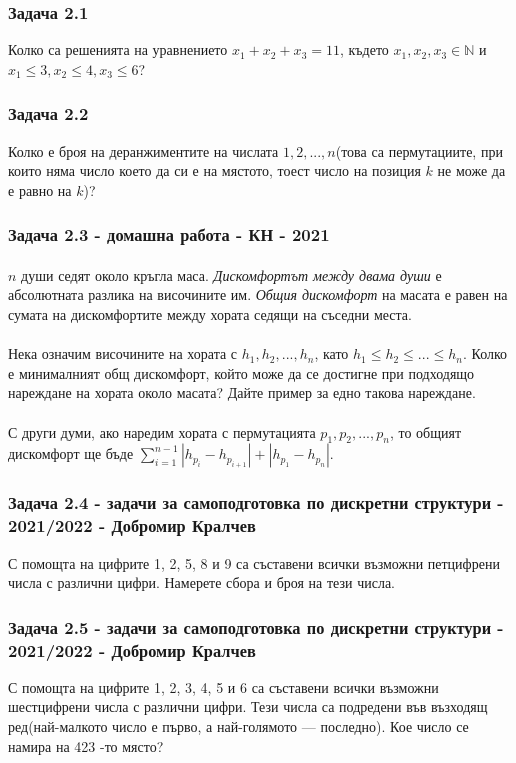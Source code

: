 \documentclass[12pt]{article}
\begin{document}
\subsubsection*{Задача 2.1}
Колко са решенията на уравнението $x_1 + x_2 + x_3 = 11$, където $x_1, x_2, x_3 \in \mathbb{N}$ и $x_1 \leq 3, x_2 \leq 4, x_3 \leq 6$?
\subsubsection*{Задача 2.2}
Колко е броя на деранжиментите на числата $1, 2, ..., n$(това са пермутациите, при които няма число което да си е на мястото, тоест число на позиция $k$ не може да е равно на $k$)?
\subsubsection*{Задача 2.3 - домашна работа - КН - 2021}
\paragraph*{}
$n$ души седят около кръгла маса. \emph{Дискомфортът между двама души} е абсолютната разлика на височините им. \emph{Общия дискомфорт} на масата е равен на
сумата на дискомфортите между хората седящи на съседни места.
\paragraph*{}
Нека означим височините на хората с $h_1, h_2, ..., h_n$, като $h_1 \leq h_2 \leq ... \leq h_n$. Колко е минималният общ дискомфорт, който може да се достигне при подходящо нареждане на хората около масата? Дайте пример за едно такова нареждане.
\paragraph*{}
С други думи, ако наредим хората с пермутацията $p_1, p_2, ..., p_n$, то общият дискомфорт ще бъде $\displaystyle\sum_{i=1}^{n-1} |h_{p_i} - h_{p_{i+1}}| + |h_{p_1} - h_{p_n}|$.

\subsubsection*{Задача 2.4 - задачи за самоподготовка по дискретни структури - 2021/2022 - Добромир Кралчев}
С помощта на цифрите 1, 2, 5, 8 и 9 са съставени всички възможни петцифрени числа с различни цифри. Намерете сбора и броя на тези числа.

\subsubsection*{Задача 2.5 - задачи за самоподготовка по дискретни структури - 2021/2022 - Добромир Кралчев}
С помощта на цифрите 1, 2, 3, 4, 5 и 6 са съставени всички възможни шестцифрени числа с различни цифри. Тези числа са подредени във възходящ ред(най-малкото число е първо, а най-голямото — последно). Кое число се намира на 423 -то място?
\end{document}
